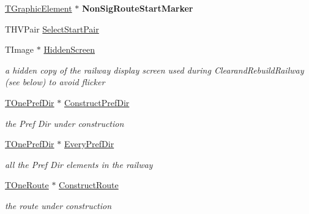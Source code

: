 \begin{DoxyCompactItemize}
\item 
\mbox{\label{class_t_interface_a645cf8babd05d66ad6b2ce4f11971813}} 
\mbox{\hyperlink{class_t_graphic_element}{T\+Graphic\+Element}} $\ast$ {\bfseries Non\+Sig\+Route\+Start\+Marker}
\item 
T\+H\+V\+Pair \mbox{\hyperlink{class_t_interface_a3e24148c477fe9d15568da4ae3f91204}{Select\+Start\+Pair}}
\item 
\mbox{\label{class_t_interface_a96224824643321a74ef63398fd5314e2}} 
T\+Image $\ast$ \mbox{\hyperlink{class_t_interface_a96224824643321a74ef63398fd5314e2}{Hidden\+Screen}}
\begin{DoxyCompactList}\small\item\em a hidden copy of the railway display screen used during Clearand\+Rebuild\+Railway (see below) to avoid flicker \end{DoxyCompactList}\item 
\mbox{\label{class_t_interface_a65dd6114d59ec7623b0577a22477a04a}} 
\mbox{\hyperlink{class_t_one_pref_dir}{T\+One\+Pref\+Dir}} $\ast$ \mbox{\hyperlink{class_t_interface_a65dd6114d59ec7623b0577a22477a04a}{Construct\+Pref\+Dir}}
\begin{DoxyCompactList}\small\item\em the Pref Dir under construction \end{DoxyCompactList}\item 
\mbox{\label{class_t_interface_ac1311ff418af9fb9ddfc24af4607614d}} 
\mbox{\hyperlink{class_t_one_pref_dir}{T\+One\+Pref\+Dir}} $\ast$ \mbox{\hyperlink{class_t_interface_ac1311ff418af9fb9ddfc24af4607614d}{Every\+Pref\+Dir}}
\begin{DoxyCompactList}\small\item\em all the Pref Dir elements in the railway \end{DoxyCompactList}\item 
\mbox{\label{class_t_interface_ab6d6b9aa3402b35dfd89610b31831402}} 
\mbox{\hyperlink{class_t_one_route}{T\+One\+Route}} $\ast$ \mbox{\hyperlink{class_t_interface_ab6d6b9aa3402b35dfd89610b31831402}{Construct\+Route}}
\begin{DoxyCompactList}\small\item\em the route under construction \end{DoxyCompactList}\item 

\end{DoxyCompactItemize}
